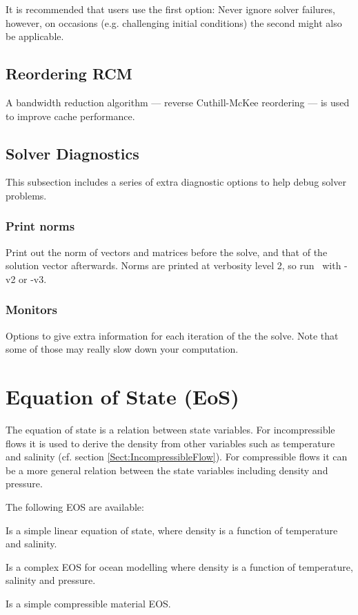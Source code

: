 It is recommended that users use the first option: Never ignore solver failures, however, on occasions (e.g. challenging initial conditions) the second might also be applicable. 

\subsection{Reordering RCM}

A bandwidth reduction algorithm --- reverse Cuthill-McKee reordering --- is used to improve cache performance.

\subsection{Solver Diagnostics}

This subsection includes a series of extra diagnostic options to help debug solver problems. 

\subsubsection{Print norms}
Print out the norm of vectors and matrices before the solve, and that of the solution vector afterwards. Norms are printed at verbosity level 2, so run \fluidity\ with -v2 or -v3.

\subsubsection{Monitors}
Options to give extra information for each iteration of the the solve. Note that some of those may really slow down your computation. 


\section{Equation of State (EoS)}\label{Sect:ConfigEOS}

The equation of state is a relation between state 
variables. For incompressible flows it is used to derive the density
from other variables such as temperature and salinity (cf. section \ref{Sect:IncompressibleFlow}). For compressible
flows it can be a more general relation between the state variables
including density and pressure.

The following EOS are available:

\begin{description}
\item{} 
Is a simple linear equation of state,
where density is a function of temperature and salinity.

\item{} Is a complex EOS for ocean modelling where density is a function of temperature, salinity and pressure.
\item{} Is a simple compressible material EOS.
\end{description}

